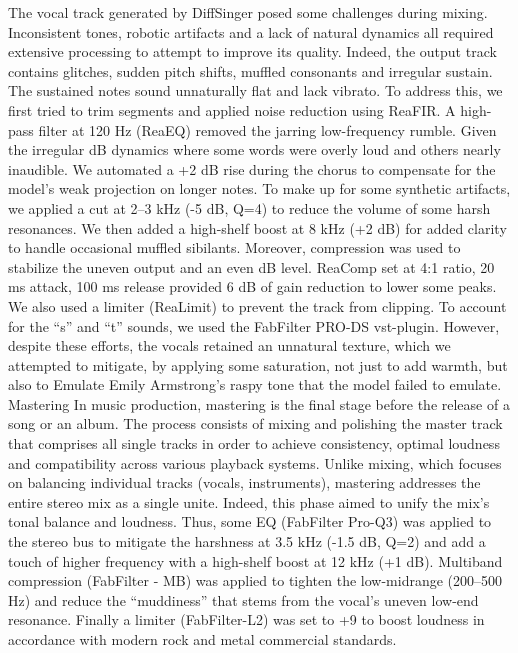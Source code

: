 \documentclass[a4paper]{article}
\begin{document}
	The vocal track generated by DiffSinger posed some challenges during mixing. Inconsistent tones, robotic artifacts and a lack of natural dynamics all required extensive processing to attempt to improve its quality. Indeed, the output track contains glitches, sudden pitch shifts, muffled consonants and irregular sustain. The sustained notes sound unnaturally flat and lack vibrato. To address this, we first tried to trim segments and applied noise reduction using ReaFIR. A high-pass filter at 120 Hz (ReaEQ) removed the jarring low-frequency rumble. Given the irregular dB dynamics where some words were overly loud and others nearly inaudible. We automated a +2 dB rise during the chorus to compensate for the model’s weak projection on longer notes. To make up for some synthetic artifacts, we applied a cut at 2–3 kHz (-5 dB, Q=4) to reduce the volume of some harsh resonances. We then added a high-shelf boost at 8 kHz (+2 dB) for added clarity to handle occasional muffled sibilants. Moreover, compression was used to stabilize the uneven output and an even dB level. ReaComp set at 4:1 ratio, 20 ms attack, 100 ms release provided 6 dB of gain reduction to lower some peaks. We also used  a limiter (ReaLimit) to prevent the track from clipping. To account for the “s” and “t” sounds, we used the FabFilter PRO-DS vst-plugin. However, despite these efforts, the vocals retained an unnatural texture, which we attempted to mitigate, by applying some saturation, not just to add warmth, but also to Emulate Emily Armstrong’s raspy tone that the model failed to emulate. 
	Mastering
	In music production, mastering is the final stage before the release of a song or an album. The process consists of mixing and polishing the master track that comprises all single tracks in order to achieve consistency, optimal loudness and compatibility across various playback systems. Unlike mixing, which focuses on balancing individual tracks (vocals, instruments), mastering addresses the entire stereo mix as a single unite. Indeed, this phase aimed to unify the mix’s tonal balance and loudness. Thus, some EQ (FabFilter Pro-Q3) was applied to the stereo bus to mitigate the harshness at 3.5 kHz (-1.5 dB, Q=2) and add a touch of higher frequency with a high-shelf boost at 12 kHz (+1 dB). Multiband compression (FabFilter - MB) was applied to tighten the low-midrange (200–500 Hz) and reduce the “muddiness” that stems from the vocal’s uneven low-end resonance. Finally a limiter (FabFilter-L2) was set to +9 to boost loudness in accordance with modern rock and metal commercial standards.
\end{document}
